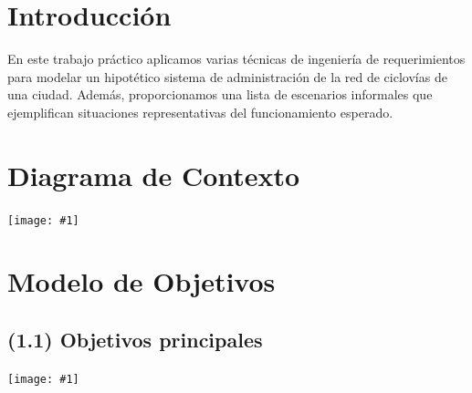 \documentclass[a4paper, 10pt, twoside]{article}
\newcommand{\diagrama}[1]{
  \texttt{[image: \#1]}
}
\begin{document}
\newpage




\tableofcontents

\newpage




\section{Introducción}

En este trabajo práctico aplicamos varias técnicas de ingeniería de requerimientos para modelar un hipotético sistema de administración de la red de ciclovías de una ciudad. Además, proporcionamos una lista de escenarios informales que ejemplifican situaciones representativas del funcionamiento esperado.




\section{Diagrama de Contexto}

\diagrama{diagrama-de-contexto}




\section{Modelo de Objetivos}

\subsection{(1.1)  Objetivos principales}
\diagrama{objetivos-1.1}
\end{document}
